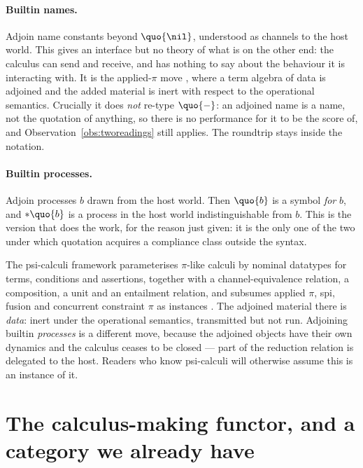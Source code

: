 \paragraph{Builtin names.}
Adjoin name constants beyond $\quo{\nil}$, understood as channels
to the host world.
This gives an interface but no theory of what is on the other end:
the calculus can send and receive, and has nothing to say about the
behaviour it is interacting with.
It is the applied-$\pi$ move \cite{abadi2001}, where a term algebra
of data is adjoined and the added material is inert with respect to
the operational semantics.
Crucially it does \emph{not} re-type $\quo{-}$: an adjoined name is
a name, not the quotation of anything, so there is no performance
for it to be the score of, and Observation~\ref{obs:tworeadings}
still applies.
The roundtrip stays inside the notation.

\paragraph{Builtin processes.}
Adjoin processes $b$ drawn from the host world.
Then $\quo{b}$ is a symbol \emph{for} $b$, and $*\quo{b}$ is a
process in the host world indistinguishable from $b$.
This is the version that does the work, for the reason just given:
it is the only one of the two under which quotation acquires a
compliance class outside the syntax.

\begin{remark}
\label{rem:psi}
The psi-calculi framework parameterises $\pi$-like calculi by
nominal datatypes for terms, conditions and assertions, together
with a channel-equivalence relation, a composition, a unit and an
entailment relation, and subsumes applied $\pi$, spi, fusion and
concurrent constraint $\pi$ as instances \cite{bengtson2011}.
The adjoined material there is \emph{data}: inert under the
operational semantics, transmitted but not run.
Adjoining builtin \emph{processes} is a different move, because the
adjoined objects have their own dynamics and the calculus ceases to
be closed --- part of the reduction relation is delegated to the
host.
Readers who know psi-calculi will otherwise assume this is an
instance of it.
\end{remark}

\section{The calculus-making functor, and a category we already have}
\label{sec:functor}

